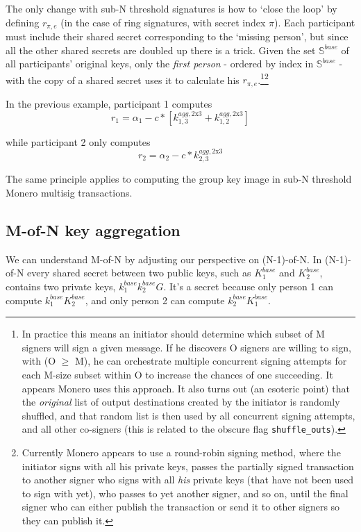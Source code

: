 The only change with sub-N threshold signatures is how to `close the loop' by defining $r_{\pi,e}$ (in the case of ring signatures, with secret index $\pi$). Each participant must include their shared secret corresponding to the `missing person', but since all the other shared secrets are doubled up there is a trick. Given the set $\mathbb{S}^{base}$ of all participants' original keys, only the {\em first person} - ordered by index in $\mathbb{S}^{base}$ - with the copy of a shared secret uses it to calculate his $r_{\pi,e}$.\footnote{In practice this means an initiator should determine which subset of M signers will sign a given message. If he discovers O signers are willing to sign, with (O $\geq$ M), he can orchestrate multiple concurrent signing attempts for each M-size subset within O to increase the chances of one succeeding. It appears Monero uses this approach. It also turns out (an esoteric point) that the {\em original} list of output destinations created by the initiator is randomly shuffled, and that random list is then used by all concurrent signing attempts, and all other co-signers (this is related to the obscure flag {\tt shuffle\_outs}).}\footnote{Currently Monero appears to use a round-robin signing method, where the initiator signs with all his private keys, passes the partially signed transaction to another signer who signs with all {\em his} private keys (that have not been used to sign with yet), who passes to yet another signer, and so on, until the final signer who can either publish the transaction or send it to other signers so they can publish it.}

In the previous example, participant 1 computes\vspace{.175cm}
\[r_1 = \alpha_1 - c*[k^{agg,\textrm{2x3}}_{1,3} + k^{agg,\textrm{2x3}}_{1,2}]\] 

while participant 2 only computes
\[r_2 = \alpha_2 - c*k^{agg,\textrm{2x3}}_{2,3}\]

The same principle applies to computing the group key image in sub-N threshold Monero multisig transactions.


\subsection{M-of-N key aggregation}
\label{sec:m-of-n}

We can understand M-of-N by adjusting our perspective on (N-1)-of-N. In (N-1)-of-N every shared secret between two public keys, such as $K^{base}_1$ and $K^{base}_2$, contains two private keys, $k^{base}_1 k^{base}_2 G$. It's a secret because only person 1 can compute $k^{base}_1 K^{base}_2$, and only person 2 can compute $k^{base}_2 K^{base}_1$.

